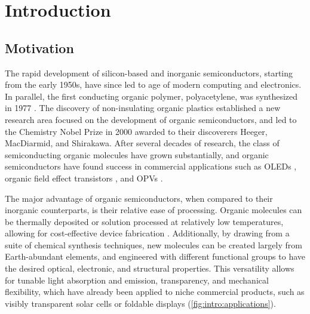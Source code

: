 
\chapter{Introduction}
\label{ch:Introduction}

\section{Motivation}



The rapid development of silicon-based and inorganic semiconductors, starting from the early 1950s, have since led to age of modern computing and electronics. In parallel, the first conducting organic polymer, polyacetylene, was synthesized in 1977 \citep{shirakawa1977synthesis,chiang1977electrical}. The discovery of non-insulating organic plastics established a new research area focused on the development of organic semiconductors, and led to the Chemistry Nobel Prize in 2000 awarded to their discoverers Heeger, MacDiarmid, and Shirakawa. After several decades of research, the class of semiconducting organic molecules have grown substantially, and organic semiconductors have found success in commercial applications such as \acp{OLED} \citep{zhu2011solution,ying2014white}, organic field effect transistors \citep{torsi2013organic,tatum2018pi}, and \acp{OPV} \citep{holliday2017recent,espinosa2015solution,gregg2003comparing,lewis2007toward}. 

The major advantage of organic semiconductors, when compared to their inorganic counterparts, is their relative ease of processing. Organic molecules can be thermally deposited or solution processed at relatively low temperatures, allowing for cost-effective device fabrication \citep{yip2012recent,huang2019organic}. Additionally, by drawing from a suite of chemical synthesis techniques, new molecules can be created largely from Earth-abundant elements, and engineered with different functional groups to have the desired optical, electronic, and structural properties. This versatility allows for tunable light absorption and emission, transparency, and mechanical flexibility, which have already been applied to niche commercial products, such as visibly transparent solar cells or foldable displays (\autoref{fig:intro:applications}). 

